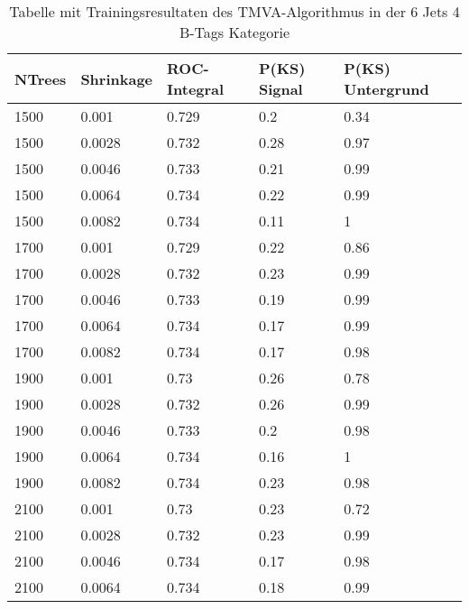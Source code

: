 \begin{table}[tbp]\parbox{12cm}{
  \caption[TMVA 6j4t Ergebnisse]{Tabelle mit Trainingsresultaten des TMVA-Algorithmus in der 6 Jets 4 B-Tags Kategorie}%
  }\label{tab:tmva_6j4t}
  \begin{center}
  \begin{tabular}{lllll}
  \hline
  NTrees & Shrinkage & ROC-Integral & P(KS) Signal & P(KS) Untergrund\\
  \hline
 \num{1500}  & \num{0,001}   & \num{0,729} & \num{0,2}  & \num{0,34}\\
 \num{1500}  & \num{0,0028}  & \num{0,732} & \num{0,28} & \num{0,97}\\
 \num{1500}  & \num{0,0046}  & \num{0,733} & \num{0,21} & \num{0,99}\\
 \num{1500}  & \num{0,0064}  & \num{0,734} & \num{0,22} & \num{0,99}\\
 \num{1500}  & \num{0,0082}  & \num{0,734} & \num{0,11} & \num{1}\\
 \num{1700}  & \num{0,001}   & \num{0,729} & \num{0,22} & \num{0,86}\\
 \num{1700}  & \num{0,0028}  & \num{0,732} & \num{0,23} & \num{0,99}\\
 \num{1700}  & \num{0,0046}  & \num{0,733} & \num{0,19} & \num{0,99}\\
 \num{1700}  & \num{0,0064}  & \num{0,734} & \num{0,17} & \num{0,99}\\
 \num{1700}  & \num{0,0082}  & \num{0,734} & \num{0,17} & \num{0,98}\\
 \num{1900}  & \num{0,001}   & \num{0,73}  & \num{0,26} & \num{0,78}\\
 \num{1900}  & \num{0,0028}  & \num{0,732} & \num{0,26} & \num{0,99}\\
 \num{1900}  & \num{0,0046}  & \num{0,733} & \num{0,2}  & \num{0,98}\\
 \num{1900}  & \num{0,0064}  & \num{0,734} & \num{0,16} & \num{1}\\
 \num{1900}  & \num{0,0082}  & \num{0,734} & \num{0,23} & \num{0,98}\\
 \num{2100}  & \num{0,001}   & \num{0,73}  & \num{0,23} & \num{0,72}\\
 \num{2100}  & \num{0,0028}  & \num{0,732} & \num{0,23} & \num{0,99}\\
 \num{2100}  & \num{0,0046}  & \num{0,734} & \num{0,17} & \num{0,98}\\
 \num{2100}  & \num{0,0064}  & \num{0,734} & \num{0,18} & \num{0,99}\\

\end{tabular}
\end{center}
\end{table}
